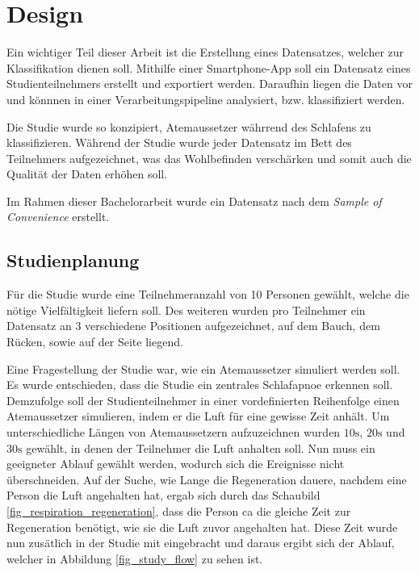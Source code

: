 \chapter{Design}
\label{ch:Design}

Ein wichtiger Teil dieser Arbeit ist die Erstellung eines Datensatzes, welcher zur Klassifikation dienen soll.
Mithilfe einer Smartphone-App soll ein Datensatz eines Studienteilnehmers erstellt und exportiert werden. 
Daraufhin liegen die Daten vor und könnnen in einer Verarbeitungspipeline analysiert, bzw. klassifiziert werden.

Die Studie wurde so konzipiert, Atemaussetzer währrend des Schlafens zu klassifizieren. 
Während der Studie wurde jeder Datensatz im Bett des Teilnehmers aufgezeichnet, was das Wohlbefinden verschärken und somit auch die Qualität der Daten erhöhen soll.

Im Rahmen dieser Bachelorarbeit wurde ein Datensatz  nach dem \textit{Sample of Convenience} erstellt.

\section{Studienplanung}
Für die Studie wurde eine Teilnehmeranzahl von 10 Personen gewählt, welche die nötige Vielfältigkeit liefern soll.
Des weiteren wurden pro Teilnehmer ein Datensatz an 3 verschiedene Positionen aufgezeichnet, auf dem Bauch, dem Rücken, sowie auf der Seite liegend.

Eine Fragestellung der Studie war, wie ein Atemaussetzer {\glqq simuliert\grqq} werden soll. 
Es wurde entschieden, dass die Studie ein zentrales Schlafapnoe erkennen soll. 
Demzufolge soll der Studienteilnehmer in einer vordefinierten Reihenfolge einen Atemaussetzer {\glqq simulieren\grqq}, indem er die Luft für eine gewisse Zeit anhält.
Um unterschiedliche Längen von Atemaussetzern aufzuzeichnen wurden $10\si{\s}$, $20\si{\s}$ und $30\si{\s}$ gewählt, in denen der Teilnehmer die Luft anhalten soll. 
Nun muss ein geeigneter Ablauf gewählt werden, wodurch sich die Ereignisse nicht überschneiden.
Auf der Suche, wie Lange die Regeneration dauere, nachdem eine Person die Luft angehalten hat, ergab sich durch das Schaubild \ref{fig_respiration_regeneration}, 
dass die Person ca die gleiche Zeit zur Regeneration benötigt, wie sie die Luft zuvor angehalten hat.
Diese Zeit wurde nun zusätlich in der Studie mit eingebracht und daraus ergibt sich der Ablauf, welcher in Abbildung \ref{fig_study_flow} zu sehen ist.

